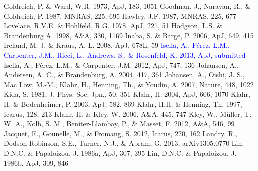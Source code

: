 \documentclass[apj]{emulateapj}
\def\blue#1{\textcolor{blue}{#1}}
\begin{document}
\begin{thebibliography}{}
 Goldreich, P. \& Ward, W.R. 1973, ApJ, 183, 1051
 Goodman, J., Narayan, R., \& Goldreich, P. 1987, MNRAS, 225, 695
 Hawley, J.F. 1987, MNRAS, 225, 677
  Lovelace, R.V.E. \& Hohlfeld, R.G. 1978, ApJ, 221, 51
 Hodgson, L.S. \& Brandenburg A. 1998, A\&A, 330, 1169
 Inaba, S. \& Barge, P. 2006, ApJ, 649, 415
 Ireland, M. J. \& Kraus, A. L. 2008, ApJ, 678L, 59
\bibitem[{{\blue{Isella et al.}}(2013)}]{Isella13} \blue{Isella, A., P\'erez, L.M., Carpenter, J.M., Ricci, L., Andrews, S., \& Rosenfeld, K. 2013, ApJ, submitted}
 Isella, A., P\'erez, L.M., \& Carpenter, J.M. 2012, ApJ, 747, 136
 Johansen, A., Andersen, A. C., \& Brandenburg, A. 2004, 417, 361
 Johansen, A., Oishi, J. S., Mac Low, M.-M., Klahr, H., Henning, Th., \& Youdin, A. 2007, Nature, 448, 1022
 Kida, S. 1981, J. Phys. Soc. Jpn.,  50, 351
 Klahr, H. 2004, ApJ, 606, 1070
 Klahr, H. \& Bodenheimer, P. 2003, ApJ, 582, 869
 Klahr, H.H. \& Henning, Th. 1997, Icarus, 128, 213
 Klahr, H. \& Kley, W. 2006, A\&A, 445, 747
 Kley, W., M\"uller, T. W. A., Kolb, S. M., Ben\'itez-Llambay, P., \& Masset, F. 2012, A\&A, 546, 99
 Jacquet, E., Gounelle, M., \& Fromang, S. 2012, Icarus, 220, 162
 Landry, R., Dodson-Robinson, S.E., Turner, N.J., \& Abram, G. 2013, arXiv1305.0770
 Lin, D.N.C. \& Papaloizou, J. 1986a, ApJ, 307, 395
 Lin, D.N.C. \& Papaloizou, J. 1986b, ApJ, 309, 846

\end{thebibliography}
\end{document}
